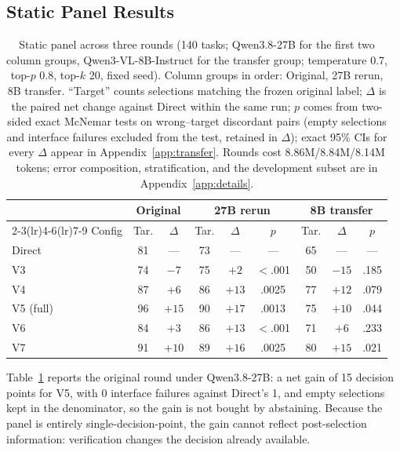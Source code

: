 \subsection{Static Panel Results}\label{sec:exp:static}

\begin{table}[t]
\centering
\setlength{\tabcolsep}{3pt}
\small
\begin{tabular}{lcc@{\hskip 4pt}ccc@{\hskip 4pt}ccc}
\toprule
& \multicolumn{2}{c}{Original} & \multicolumn{3}{c}{27B rerun} &
\multicolumn{3}{c}{8B transfer} \\
\cmidrule(lr){2-3}\cmidrule(lr){4-6}\cmidrule(lr){7-9}
Config & Tar. & $\Delta$ & Tar. & $\Delta$ & $p$ & Tar. & $\Delta$ & $p$ \\
\midrule
Direct & 81 & --- & 73 & --- & --- & 65 & --- & --- \\
V3 & 74 & $-7$ & 75 & $+2$ & $<$.001 & 50 & $-15$ & .185 \\
V4 & 87 & $+6$ & 86 & $+13$ & .0025 & 77 & $+12$ & .079 \\
V5 (full) & 96 & $+15$ & 90 & $+17$ & .0013 & 75 & $+10$ & .044 \\
V6 & 84 & $+3$ & 86 & $+13$ & $<$.001 & 71 & $+6$ & .233 \\
V7 & 91 & $+10$ & 89 & $+16$ & .0025 & 80 & $+15$ & .021 \\
\bottomrule
\end{tabular}
\caption{Static panel across three rounds (140 tasks;
Qwen3.8-27B for the first two column groups,
Qwen3-VL-8B-Instruct for the transfer group;
temperature 0.7, top-$p$ 0.8, top-$k$ 20, fixed seed).
Column groups in order: Original, 27B rerun, 8B
transfer. ``Target'' counts selections matching the
frozen original label; $\Delta$ is the paired net change
against Direct within the same run; $p$ comes from
two-sided exact McNemar tests on wrong--target
discordant pairs \citep{mcnemar1947note} (empty
selections and interface failures excluded from the
test, retained in $\Delta$); exact 95\% CIs for every
$\Delta$ appear in Appendix~\ref{app:transfer}. Rounds
cost 8.86M/8.84M/8.14M tokens; error composition,
stratification, and the development subset are in
Appendix~\ref{app:details}.}
\label{tab:static-main}
\end{table}

Table~\ref{tab:static-main} reports the original round
under Qwen3.8-27B: a net gain of 15 decision points for
V5, with 0 interface failures against Direct's 1, and
empty selections kept in the denominator, so the gain is
not bought by abstaining.
Because the panel is entirely single-decision-point,
the gain cannot reflect post-selection information: verification changes the decision
already available.

